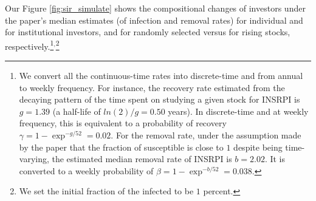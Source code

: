 Our Figure \ref{fig:sir_simulate} shows the compositional changes of investors under the paper's median estimates (of infection and removal rates) for individual and for institutional investors, and for randomly selected versus for rising stocks, respectively.\footnote{We convert all the continuous-time rates into discrete-time and from annual to weekly frequency. For instance, the recovery rate estimated from the decaying pattern of the time spent on studying a given stock for INSRPI is $g=1.39$ (a half-life of $ln(2)/g=0.50$ years). In discrete-time and at weekly frequency, this is equivalent to a probability of recovery $\gamma = 1-\exp^{-g/52} =0.02$. For the removal rate, under the assumption made by the paper that the fraction of susceptible is close to $1$ despite being time-varying, the estimated median removal rate of INSRPI is $b = 2.02$. It is converted to a weekly probability of $\beta = 1-\exp^{-b/52}=0.038$.}$^{,}$\footnote{We set the initial fraction of the infected to be $1$ percent.}


